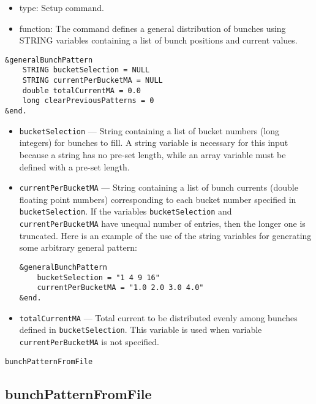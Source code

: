 \documentclass[11pt]{article}
\begin{document}
\begin{itemize}
\item type: Setup command.
\item function: The command defines a general distribution of bunches
    using STRING variables containing a list of bunch positions and
    current values.
\end{itemize}
\begin{verbatim}
&generalBunchPattern
    STRING bucketSelection = NULL
    STRING currentPerBucketMA = NULL
    double totalCurrentMA = 0.0
    long clearPreviousPatterns = 0
&end.
\end{verbatim}
\begin{itemize}
\item {\tt bucketSelection} --- String containing a list of bucket
      numbers (long integers) for bunches to fill.  A string variable
      is necessary for this input because a string has no pre-set
      length, while an array variable must be defined with a pre-set
      length.
\item {\tt currentPerBucketMA} --- String containing a list of bunch
      currents (double floating point numbers) corresponding to each
      bucket number specified in {\tt bucketSelection}.  If the
      variables {\tt bucketSelection} and {\tt currentPerBucketMA}
      have unequal number of entries, then the longer one is
      truncated.  Here is an example of the use of the string
      variables for generating some arbitrary general pattern:
\begin{verbatim}
&generalBunchPattern
    bucketSelection = "1 4 9 16"
    currentPerBucketMA = "1.0 2.0 3.0 4.0"
&end.
\end{verbatim}
\item {\tt totalCurrentMA} --- Total current to be distributed
evenly among bunches defined in {\tt bucketSelection}.  This variable
is used when variable {\tt currentPerBucketMA} is not specified.
\end{itemize}

\newpage
\begin{center}\tt bunchPatternFromFile\end{center}
\subsection{bunchPatternFromFile}
\end{document}
